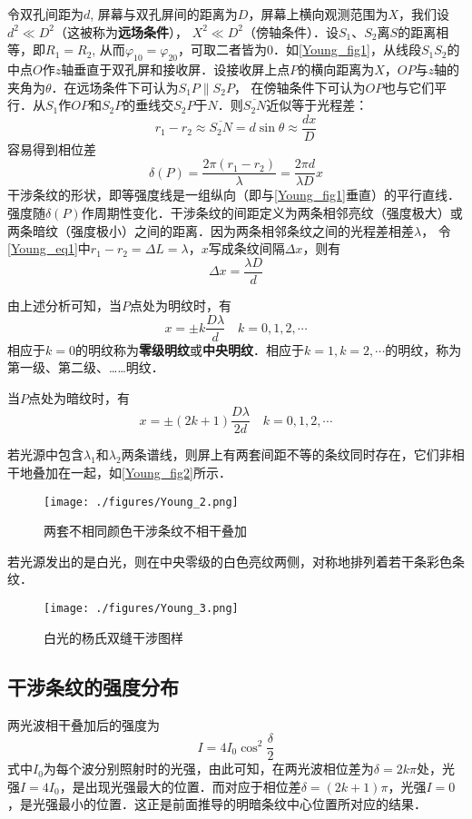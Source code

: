 令双孔间距为$d$, 屏幕与双孔屏间的距离为$D$，屏幕上横向观测范围为$X$，我们设$d^{2} \ll D^{2}$（这被称为\textbf{远场条件}）， $X^{2} \ll D^{2}$（傍轴条件）．设$S_1$、$S_2$离$S$的距离相等，即$R_1=R_2$, 从而$\varphi_{10}=\varphi_{20}$，可取二者皆为$0$．如\autoref{Young_fig1}，从线段$S_1S_2$的中点$O$作$z$轴垂直于双孔屏和接收屏．设接收屏上点$P$的横向距离为$X$，$OP$与$z$轴的夹角为$\theta$．在远场条件下可认为$S_1P\parallel S_2P$， 在傍轴条件下可认为$OP$也与它们平行．从$S_1$作$OP$和$S_2P$的垂线交$S_2P$于$N$．则$\overline{S_2N}$近似等于光程差：
\begin{equation} \label{Young_eq1}
r_{1}-r_{2} \approx \overline{S_{2} N}=d \sin \theta \approx \frac{d x}{D}
\end{equation}
容易得到相位差
\begin{equation}
\delta(P)=\frac{2 \pi\left(r_{1}-r_{2}\right)}{\lambda}=\frac{2 \pi d}{\lambda D} x
\end{equation}
干涉条纹的形状，即等强度线是一组纵向（即与\autoref{Young_fig1}垂直）的平行直线．强度随$\delta(P)$作周期性变化．干涉条纹的间距定义为两条相邻亮纹（强度极大）或两条暗纹（强度极小）之间的距离．因为两条相邻条纹之间的光程差相差$\lambda$， 令\autoref{Young_eq1}中$r_1-r_2=\Delta L=\lambda$，$ x $写成条纹间隔$\Delta x$，则有
\begin{equation}
\Delta x=\frac{\lambda D}{d}
\end{equation}

由上述分析可知，当$P$点处为明纹时，有
\begin{equation}
x=\pm k \frac{D \lambda}{d} \quad k=0,1,2, \cdots
\end{equation}
相应于$k=0$的明纹称为\textbf{零级明纹}或\textbf{中央明纹}．相应于$k=1, k=2, \cdots$的明纹，称为第一级、第二级、……明纹．

当$P$点处为暗纹时，有
\begin{equation}
x=\pm(2 k+1) \frac{D \lambda}{2 d} \quad k=0,1,2, \cdots
\end{equation}

若光源中包含$\lambda_1$和$\lambda_2$两条谱线，则屏上有两套间距不等的条纹同时存在，它们非相干地叠加在一起，如\autoref{Young_fig2}所示．
\begin{figure}[ht]
\centering
\texttt{[image: ./figures/Young\_2.png]}
\caption{两套不相同颜色干涉条纹不相干叠加} \label{Young_fig2}
\end{figure}
若光源发出的是白光，则在中央零级的白色亮纹两侧，对称地排列着若干条彩色条纹．
\begin{figure}[ht]
\centering
\texttt{[image: ./figures/Young\_3.png]}
\caption{白光的杨氏双缝干涉图样} \label{Young_fig3}
\end{figure}
\subsection{干涉条纹的强度分布}
两光波相干叠加后的强度为%
\begin{equation}
I=4 I_{0} \cos ^{2} \frac{\delta}{2}
\end{equation}
式中$I_0$为每个波分别照射时的光强，由此可知，在两光波相位差为$\delta=2k\pi$处，光强$I=4I_0$，是出现光强最大的位置．而对应于相位差$\delta=(2k+1)\pi$，光强$I=0$，是光强最小的位置．这正是前面推导的明暗条纹中心位置所对应的结果．
